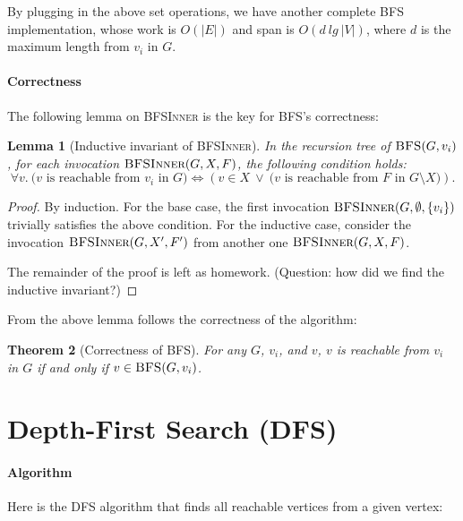 \documentclass[11pt,a4paper,oneside,microtype,nokorean]{oblivoir}
\newtheorem{theorem}{Theorem}
\newtheorem{lemma}[theorem]{Lemma}
\begin{document}
By plugging in the above set operations, we have another complete BFS implementation, whose work is
$O(|E|)$ and span is $O(d~lg~|V|)$, where $d$ is the maximum length from $v_i$ in $G$.


\paragraph{Correctness} The following lemma on \textsc{BFSInner} is the key for BFS's correctness:

\begin{lemma}[Inductive invariant of \textsc{BFSInner}] In the recursion tree of
  $\textsc{BFS}(G,v_i)$, for each invocation $\textsc{BFSInner}(G,X,F)$, the following condition
  holds:
  \[ \forall v.~\mbox{($v$ is reachable from $v_i$ in $G$)} \iff (v \in X~\lor~\mbox{($v$ is
      reachable from $F$ in $G \setminus X$)}).
  \]  
\end{lemma}
\begin{proof}
  By induction.  For the base case, the first invocation $\textsc{BFSInner}(G,\emptyset,\{v_i\})$
  trivially satisfies the above condition.  For the inductive case, consider the invocation
  $\textsc{BFSInner}(G,X',F')$ from another one $\textsc{BFSInner}(G,X,F)$.

  The remainder of the proof is left as homework.  (Question: how did we find the inductive
  invariant?)
\end{proof}

From the above lemma follows the correctness of the algorithm:

\begin{theorem}[Correctness of \textsc{BFS}] For any $G$, $v_i$, and $v$, $v$ is reachable from
  $v_i$ in $G$ if and only if $v \in \textsc{BFS}(G,v_i)$.
\end{theorem}



\section{Depth-First Search (DFS)}

\paragraph{Algorithm}

Here is the DFS algorithm that finds all reachable vertices from a given vertex:
\end{document}
